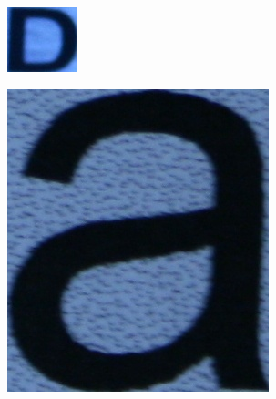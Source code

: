 \documentclass[a4paper]{article}
\begin{document}
\begin{enumerate}
\begin{enumerate}
\begin{figure}[H]
            \hfill
            \begin{subfigure}[b]{.3\linewidth}
	            \includegraphics[width=\linewidth]{HW1-release/data/character_classification/new_images/13_D.jpg}
	        \end{subfigure}
	        \hfill
	        \begin{subfigure}[b]{.22\linewidth}
	            \includegraphics[width=\linewidth]{HW1-release/data/character_classification/new_images/14_A.jpg}

\end{subfigure}
\end{figure}
\end{enumerate}
\end{enumerate}
\end{document}
